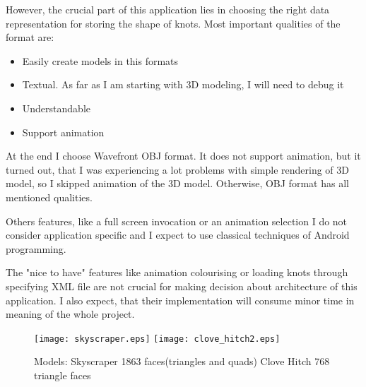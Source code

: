 However, the crucial part of this application lies 
in choosing the right data representation for storing the shape of knots.
Most important qualities of the format are:
\begin{itemize}
    \item Easily create models in this formats
    \item Textual. As far as I am starting with 3D modeling, 
    I will need to debug it
    \item Understandable
    \item Support animation
\end{itemize}

At the end I choose Wavefront OBJ format. It does not support animation, but it turned out,
that I was experiencing a lot problems with simple rendering of 3D model,
so I skipped animation of the 3D model. Otherwise, OBJ format has all mentioned qualities.

Others features, like a full screen invocation or an animation selection
I do not consider application specific and I expect
to use classical techniques of Android programming.

The "nice to have" features like animation colourising 
or loading knots through specifying XML file are not crucial 
for making decision about architecture of this application. 
I also expect, that their implementation will consume minor time
in meaning of the whole project.

\begin{figure}
\texttt{[image: skyscraper.eps]}
\texttt{[image: clove\_hitch2.eps]}
\label{pic:models}
\caption{Models: Skyscraper 1863 faces(triangles and quads) Clove Hitch 768 triangle faces}
\end{figure}

